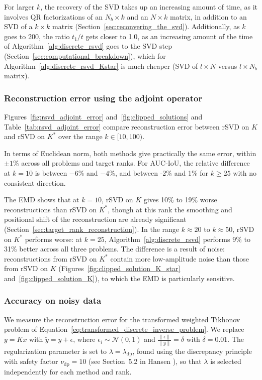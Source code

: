 For larger $k$, the recovery of the SVD takes up an increasing amount of time, as it involves QR factorizations of an $N_b \times k$ and an $N \times k$ matrix, in addition to an SVD of a $k \times k$ matrix (Section~\ref{sec:reconvering_the_svd}). Additionally, as $k$ goes to $200$, the ratio $t_1 / t$ gets closer to 1.0, as an increasing amount of the time of Algorithm~\ref{alg:discrete_rsvd} goes to the SVD step (Section~\ref{sec:computational_breakdown}), which for Algorithm~\ref{alg:discrete_rsvd_Kstar} is much cheaper (SVD of $l \times N$ versus $l \times N_b$ matrix).


\subsubsection{Reconstruction error using the adjoint operator}\label{sec:reconstruction_error_using_the_adjoint_operator}



Figures~\ref{fig:rsvd_adjoint_error} and~\ref{fig:clipped_solutions} and Table~\ref{tab:rsvd_adjoint_error} compare reconstruction error between rSVD on $K$ and rSVD on $K^*$ over the range $k \in [10, 100)$.

In terms of Euclidean norm, both methods give practically the same error, within $\pm 1$\% across all problems and target ranks. For AUC-IoU, the relative difference at $k = 10$ is between $-6$\% and $-4$\%, and between -2\% and 1\% for $k \ge 25$ with no consistent direction.

The EMD shows that at $k = 10$, rSVD on $K$ gives 10\% to 19\% worse reconstructions than rSVD on $K^*$, though at this rank the smoothing and positional shift of the reconstruction are already significant (Section~\ref{sec:target_rank_reconstruction}). In the range $k \approx 20$ to $k \approx 50$, rSVD on $K^*$ performs worse: at $k=25$, Algorithm~\ref{alg:discrete_rsvd} performs 9\% to 31\% better across all three problems. The difference is a result of noise: reconstructions from rSVD on $K^*$ contain more low-amplitude noise than those from rSVD on $K$ (Figures~\ref{fig:clipped_solution_K_star} and~\ref{fig:clipped_solution_K}), to which the EMD is particularly sensitive.


\subsubsection{Accuracy on noisy data}\label{sec:accuracy_on_noisy_data}
We measure the reconstruction error for the transformed weighted Tikhonov problem of Equation~\eqref{eq:transformed_discrete_inverse_problem}. We replace $y = K x$ with $\tilde y = y + \epsilon$, where $\epsilon_i \sim \mathcal{N}(0, 1)$ and $\tfrac{\| \epsilon \|}{\| y \|} = \delta$ with $\delta = 0.01$. The regularization parameter is set to $\lambda = \lambda_{\text{dp}}$, found using the discrepancy principle with safety factor $\nu_{\text{dp}} = 10$ (see Section~5.2 in Hansen \cite{hansen2010discrete}), so that $\lambda$ is selected independently for each method and rank.




